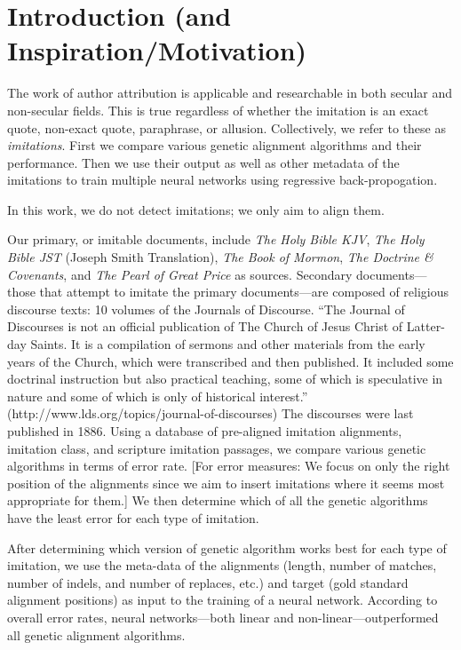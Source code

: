 \section {Introduction (and Inspiration/Motivation)}

The work of author attribution is applicable and researchable in both secular and non-secular fields. This is true regardless of whether the imitation is an exact quote, non-exact quote, paraphrase, or allusion. Collectively, we refer to these as \textit{imitations}. First we compare various genetic alignment algorithms and their performance. Then we use their output as well as other metadata of the imitations to train multiple neural networks using regressive back-propogation. 

In this work, we do not detect imitations; we only aim to align them. 

Our primary, or imitable documents, include \textit{The Holy Bible KJV}, \textit{The Holy Bible JST} (Joseph Smith Translation), \textit{The Book of Mormon}, \textit{The Doctrine \& Covenants}, and \textit{The Pearl of Great Price} as sources. Secondary documents---those that attempt to imitate the primary documents---are composed of religious discourse texts: 10 volumes of the Journals of Discourse. ``The Journal of Discourses is not an official publication of The Church of Jesus Christ of Latter-day Saints. It is a compilation of sermons and other materials from the early years of the Church, which were transcribed and then published. It included some doctrinal instruction but also practical teaching, some of which is speculative in nature and some of which is only of historical interest.'' (http://www.lds.org/topics/journal-of-discourses) The discourses were last published in 1886. Using a database of pre-aligned imitation alignments, imitation class, and scripture imitation passages, we compare various genetic algorithms in terms of error rate. %
[For error measures: We focus on only the right position of the alignments since we aim to insert imitations where it seems most appropriate for them.] We then determine which of all the genetic algorithms have the least error for each type of imitation.

After determining which version of genetic algorithm works best for each type of imitation, we use the meta-data of the alignments (length, number of matches, number of indels, and number of replaces, etc.) and target (gold standard alignment positions) as input to the training of a neural network. %
According to overall error rates, neural networks---both linear and non-linear---outperformed all genetic alignment algorithms. %

